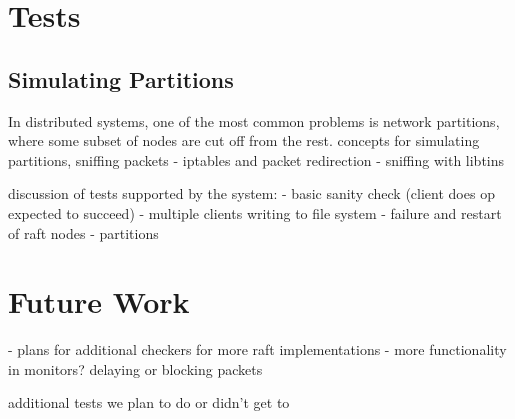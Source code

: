 \documentclass[UTF8]{article}
\begin{document}
\section{Tests}

\subsection{Simulating Partitions}

In distributed systems, one of the most common problems is network partitions, where some subset of nodes are cut off from the rest. 
concepts for simulating partitions, sniffing packets
- iptables and packet redirection
- sniffing with libtins

discussion of tests supported by the system:
- basic sanity check (client does op expected to succeed)
- multiple clients writing to file system
- failure and restart of raft nodes
- partitions

\section{Future Work}

- plans for additional checkers for more raft implementations
- more functionality in monitors? delaying or blocking packets

additional tests we plan to do or didn't get to




\end{document}
